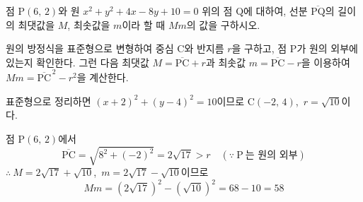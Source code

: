 \documentclass[10pt]{article}
\begin{document}
\begin{dmproblem}
점 $\mathrm{P}(6,\, 2)$와 원 $x^2 + y^2 + 4x - 8y + 10 = 0$ 위의 점 $\mathrm{Q}$에 대하여, 선분 $\overline{\mathrm{PQ}}$의 길이의 최댓값을 $M$, 최솟값을 $m$이라 할 때 $Mm$의 값을 구하시오.
\end{dmproblem}

\begin{dmapproach}
원의 방정식을 표준형으로 변형하여 중심 $\mathrm{C}$와 반지름 $r$을 구하고, 점 $\mathrm{P}$가 원의 외부에 있는지 확인한다. 그런 다음 최댓값 $M = \overline{\mathrm{PC}} + r$과 최솟값 $m = \overline{\mathrm{PC}} - r$을 이용하여 $Mm = \overline{\mathrm{PC}}^{\,2} - r^2$을 계산한다.
\end{dmapproach}

\begin{dmsolution}
표준형으로 정리하면 $(x + 2)^2 + (y - 4)^2 = 10$이므로 $\mathrm{C}(-2,\, 4)$,\ $r = \sqrt{10}$이다.

점 $\mathrm{P}(6,\, 2)$에서
\begin{equation*}
  \overline{\mathrm{PC}} = \sqrt{8^2 + (-2)^2} = 2\sqrt{17} > r \quad (\because\ \mathrm{P}\ \text{는 원의 외부})
\end{equation*}
$\therefore\ M = 2\sqrt{17} + \sqrt{10}$,\ $m = 2\sqrt{17} - \sqrt{10}$이므로
\begin{equation*}
  Mm = (2\sqrt{17})^2 - (\sqrt{10})^2 = 68 - 10 = 58
\end{equation*}
\end{dmsolution}

\dmchecktitle



\newpage

\dmconcepthead
{}
\end{document}
